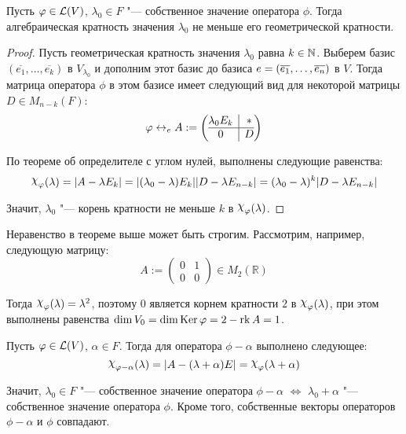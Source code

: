 \begin{theorem}
	Пусть $\varphi \in \mathcal L (V)$, $\lambda_0 \in F$ "--- собственное значение оператора $\phi$. Тогда алгебраическая кратность значения $\lambda_0$ не меньше его геометрической кратности.
\end{theorem}

\begin{proof}
	Пусть геометрическая кратность значения $\lambda_0$ равна $k \in \mathbb{N}$. Выберем базис $(\overline{e_1}, \dots, \overline{e_k})$ в $V_{\lambda_0}$ и дополним этот базис до базиса $e \hm{=} (\overline{e_1}, \dots, \overline{e_n})$ в $V$. Тогда матрица оператора $\phi$ в этом базисе имеет следующий вид для некоторой матрицы $D \in M_{n - k}(F)$:
	\[
	\phi \leftrightarrow_e A :=
	\left(\begin{array}{@{}c|c@{}}
		\lambda_0 E_k & *\\
		\hline
		0 & D\end{array}\right)
	\]
	
	По теореме об определителе с углом нулей, выполнены следующие равенства:
	\[\Chi_\phi(\lambda) = |A - \lambda E_k| = |(\lambda_0 - \lambda)E_k||D - \lambda E_{n - k}| \hm= (\lambda_0 - \lambda)^k|D - \lambda E_{n - k}|\]
	
	Значит, $\lambda_0$ "--- корень кратности не меньше $k$ в $\Chi_\phi(\lambda)$.
\end{proof}

\begin{note}
	Неравенство в теореме выше может быть строгим. Рассмотрим, например, следующую матрицу:
	\[A := \begin{pmatrix}0 & 1\\0 & 0\end{pmatrix} \in M_2(\mathbb{R})\]
	
	Тогда $\Chi_\phi(\lambda) = \lambda^2$, поэтому $0$ является корнем кратности $2$ в $\Chi_\phi(\lambda)$, при этом выполнены равенства $\dim{V_0} = \dim{\operatorname{Ker}{\ensuremath{\varphi}}} = 2 - \operatorname{rk}{A} = 1$.
\end{note}

\begin{note}
	Пусть $\varphi \in \mathcal L (V)$, $\alpha \in F$. Тогда для оператора $\phi - \alpha$ выполнено следующее:
	\[\Chi_{\phi - \alpha}(\lambda) = |A - (\lambda + \alpha)E| \hm= \Chi_{\phi}(\lambda + \alpha)\]
	
	Значит, $\lambda_0 \in F$ "--- собственное значение оператора $\phi - \alpha$ $\Leftrightarrow$ $\lambda_0 + \alpha$ "--- собственное значение оператора $\phi$. Кроме того, собственные векторы операторов $\phi - \alpha$ и $\phi$ совпадают.
\end{note}

